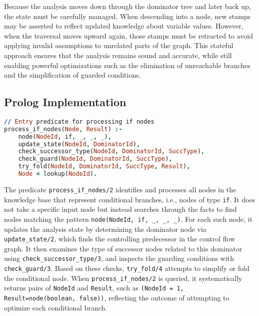 Because the analysis moves down through the dominator tree and later back up, the state must be carefully managed. When descending into a node, new stamps may be asserted to reflect updated knowledge about variable values. However, when the traversal moves upward again, those stamps must be retracted to avoid applying invalid assumptions to unrelated parts of the graph. This stateful approach ensures that the analysis remains sound and accurate, while still enabling powerful optimizations such as the elimination of unreachable branches and the simplification of guarded conditions.

\subsection*{Prolog Implementation}
\begin{lstlisting}[language=Prolog]
// Entry predicate for processing if nodes
process_if_nodes(Node, Result) :-
    node(NodeId, if, _, _, _),
    update_state(NodeId, DominatorId),
    check_successor_type(NodeId, DominatorId, SuccType),
    check_guard(NodeId, DominatorId, SuccType),
    try_fold(NodeId, DominatorId, SuccType, Result),
    Node = lookup(NodeId).
\end{lstlisting}

The predicate \texttt{process\_if\_nodes/2} identifies and processes all nodes in the knowledge base that represent conditional branches, i.e., nodes of type \texttt{if}. It does not take a specific input node but instead searches through the facts to find nodes matching the pattern \texttt{node(NodeId, if, \_, \_, \_)}.
For each such node, it updates the analysis state by determining the dominator node via \texttt{update\_state/2}, which finds the controlling predecessor in the control flow graph. It then examines the type of successor nodes related to this dominator using \texttt{check\_successor\_type/3}, and inspects the guarding conditions with \texttt{check\_guard/3}. Based on these checks, \texttt{try\_fold/4} attempts to simplify or fold the conditional node.  When \texttt{process\_if\_nodes/2} is queried, it systematically returns pairs of \texttt{NodeId} and \texttt{Result}, such as \texttt{(NodeId = 1, Result=node(boolean, false))}, reflecting the outcome of attempting to optimize each conditional branch.

